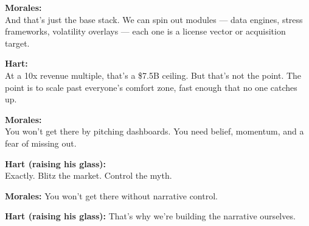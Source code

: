 \medskip

\textbf{Morales:} \\
And that’s just the base stack.  
We can spin out modules — data engines, stress frameworks, volatility overlays — each one is a license vector or acquisition 
target.

\textbf{Hart:} \\
At a 10x revenue multiple, that’s a \$7.5B ceiling.  
But that’s not the point. The point is to scale past everyone’s comfort zone, fast enough that no one catches up.

\textbf{Morales:} \\
You won’t get there by pitching dashboards. You need belief, momentum, and a fear of missing out.

\textbf{Hart (raising his glass):} \\
Exactly. Blitz the market. Control the myth.  

\textbf{Morales:}  
You won’t get there without narrative control.

\textbf{Hart (raising his glass):}  
That’s why we’re building the narrative ourselves.

\medskip

